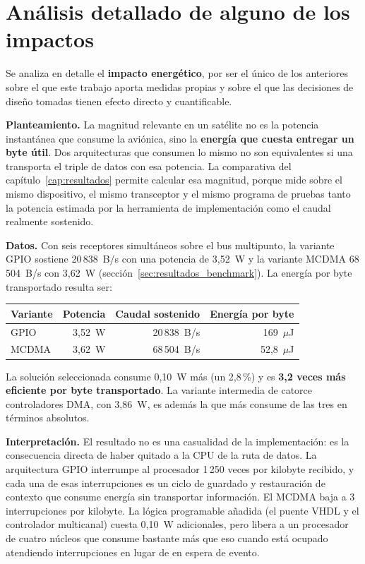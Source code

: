 \section{Análisis detallado de alguno de los impactos}
\normalsize{%
Se analiza en detalle el \textbf{impacto energético}, por ser el único de los anteriores sobre el
que este trabajo aporta medidas propias y sobre el que las decisiones de diseño tomadas tienen
efecto directo y cuantificable.

\textbf{Planteamiento.} La magnitud relevante en un satélite no es la potencia instantánea que
consume la aviónica, sino la \textbf{energía que cuesta entregar un byte útil}. Dos arquitecturas
que consumen lo mismo no son equivalentes si una transporta el triple de datos con esa potencia. La
comparativa del capítulo~\ref{cap:resultados} permite calcular esa magnitud, porque mide sobre el mismo dispositivo,
el mismo transceptor y el mismo programa de pruebas tanto la potencia estimada por la herramienta
de implementación como el caudal realmente sostenido.

\textbf{Datos.} Con seis receptores simultáneos sobre el bus multipunto, la variante GPIO sostiene
20\,838~B/s con una potencia de 3,52~W y la variante MCDMA 68\,504~B/s con 3,62~W
(sección~\ref{sec:resultados_benchmark}). La energía por byte transportado resulta ser:

\begin{center}
\begin{tabular}{lrrr}
\hline
\textbf{Variante} & \textbf{Potencia} & \textbf{Caudal sostenido} & \textbf{Energía por byte} \\
\hline
GPIO  & 3,52~W & 20\,838~B/s & 169~$\mu$J \\
MCDMA & 3,62~W & 68\,504~B/s & 52,8~$\mu$J \\
\hline
\end{tabular}
\end{center}

La solución seleccionada consume 0,10~W más (un 2,8\,\%) y es \textbf{3,2 veces más eficiente por
byte transportado}. La variante intermedia de catorce controladores DMA, con 3,86~W, es además
la que más consume de las tres en términos absolutos.

\textbf{Interpretación.} El resultado no es una casualidad de la implementación: es la consecuencia
directa de haber quitado a la CPU de la ruta de datos. La arquitectura GPIO interrumpe al
procesador 1\,250 veces por kilobyte recibido, y cada una de esas interrupciones es un ciclo de
guardado y restauración de contexto que consume energía sin transportar información. El MCDMA baja
a 3 interrupciones por kilobyte. La lógica programable añadida (el puente VHDL y el controlador
multicanal) cuesta 0,10~W adicionales, pero libera a un procesador de cuatro núcleos que consume
bastante más que eso cuando está ocupado atendiendo interrupciones en lugar de en espera de
evento.

}
